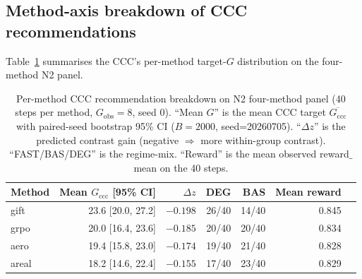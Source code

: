 %
%

\subsection*{Method-axis breakdown of CCC recommendations}

Table~\ref{tab:p7-method-axis-ccc} summarises the CCC's per-method
target-$G$ distribution on the four-method N2 panel.

\begin{table}[h]
\centering\small
\caption{Per-method CCC recommendation breakdown on N2 four-method panel
(40 steps per method, $G_{\mathrm{obs}}{=}8$, seed 0).  ``Mean $G$''
is the mean CCC target $\overline{G_{\mathrm{ccc}}}$ with paired-seed
bootstrap 95\% CI ($B{=}2000$, seed=20260705).  ``$\Delta z$'' is the
predicted contrast gain (negative $\Rightarrow$ more within-group
contrast).  ``FAST/BAS/DEG'' is the regime-mix.  ``Reward'' is the
mean observed reward$\_$mean on the 40 steps.}
\label{tab:p7-method-axis-ccc}
\begin{tabular}{lrrrrrr}
\toprule
Method & Mean $G_{\mathrm{ccc}}$ [95\% CI] & $\Delta z$ & DEG & BAS & Mean reward \\
\midrule
gift  & 23.6 [20.0, 27.2] & $-0.198$ & 26/40 & 14/40 & 0.845 \\
grpo  & 20.0 [16.4, 23.6] & $-0.185$ & 20/40 & 20/40 & 0.834 \\
aero  & 19.4 [15.8, 23.0] & $-0.174$ & 19/40 & 21/40 & 0.828 \\
areal & 18.2 [14.6, 22.4] & $-0.155$ & 17/40 & 23/40 & 0.829 \\
\bottomrule
\end{tabular}
\end{table}

